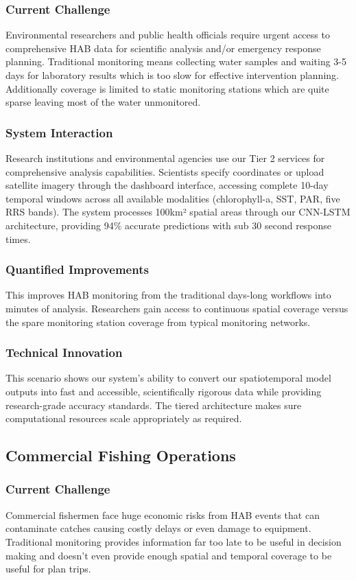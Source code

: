 \documentclass[conference]{IEEEtran}
\begin{document}
\subsubsection{Current Challenge}
Environmental researchers and public health officials require urgent access to comprehensive HAB data for scientific analysis and/or emergency response planning. Traditional monitoring means collecting water samples and waiting 3-5 days for laboratory results which is too slow for effective intervention planning. Additionally coverage is limited to static monitoring stations which are quite sparse leaving most of the water unmonitored.

\subsubsection{System Interaction}
Research institutions and environmental agencies use our Tier 2 services for comprehensive analysis capabilities. Scientists specify coordinates or upload satellite imagery through the dashboard interface, accessing complete 10-day temporal windows across all available modalities (chlorophyll-a, SST, PAR, five RRS bands). The system processes 100km² spatial areas through our CNN-LSTM architecture, providing 94\% accurate predictions with sub 30 second response times.
\subsubsection{Quantified Improvements}
This improves HAB monitoring from the traditional days-long workflows into minutes of analysis. Researchers gain access to continuous spatial coverage versus the spare monitoring station coverage from typical monitoring networks.

\subsubsection{Technical Innovation}
This scenario shows our system's ability to convert our spatiotemporal model outputs into fast and accessible, scientifically rigorous data while providing research-grade accuracy standards. The tiered architecture makes sure computational resources scale appropriately as required.


\subsection{Commercial Fishing Operations}
\subsubsection{Current Challenge}
Commercial fishermen face huge economic risks from HAB events that can contaminate catches causing costly delays or even damage to equipment. Traditional monitoring provides information far too late to be useful in decision making and doesn't even provide enough spatial and temporal coverage to be useful for plan trips. 
\end{document}
